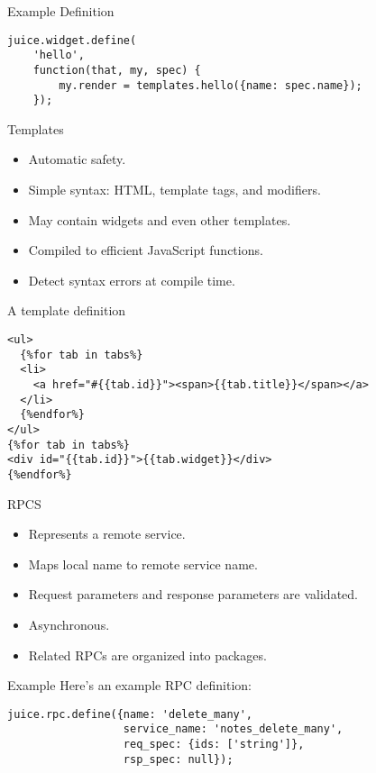 \documentclass{beamer}
\begin{document}
\begin{frame}[fragile]{Example Definition}
\begin{verbatim}
juice.widget.define(
    'hello',
    function(that, my, spec) {
        my.render = templates.hello({name: spec.name});
    });
\end{verbatim}
\end{frame}

\begin{frame}{Templates}
  \begin{itemize}
  \item Automatic safety.
  \item Simple syntax: HTML, template tags, and modifiers.
  \item May contain widgets and even other templates.
  \item Compiled to efficient JavaScript functions.
  \item Detect syntax errors at compile time.
  \end{itemize}
\end{frame}

\begin{frame}[fragile]{A template definition}
\begin{verbatim}
<ul>
  {%for tab in tabs%}
  <li>
    <a href="#{{tab.id}}"><span>{{tab.title}}</span></a>
  </li>
  {%endfor%}
</ul>
{%for tab in tabs%}
<div id="{{tab.id}}">{{tab.widget}}</div>
{%endfor%}
\end{verbatim}
\end{frame}

\begin{frame}{RPCS}
  \begin{itemize}
  \item Represents a remote service.
  \item Maps local name to remote service name.
  \item Request parameters and response parameters are validated.
  \item Asynchronous.
  \item Related RPCs are organized into packages.
  \end{itemize}
\end{frame}

\begin{frame}[fragile]{Example}
Here's an example RPC definition:
\begin{verbatim}
juice.rpc.define({name: 'delete_many',
                  service_name: 'notes_delete_many',
                  req_spec: {ids: ['string']},
                  rsp_spec: null});
\end{verbatim}
\end{frame}
\end{document}
